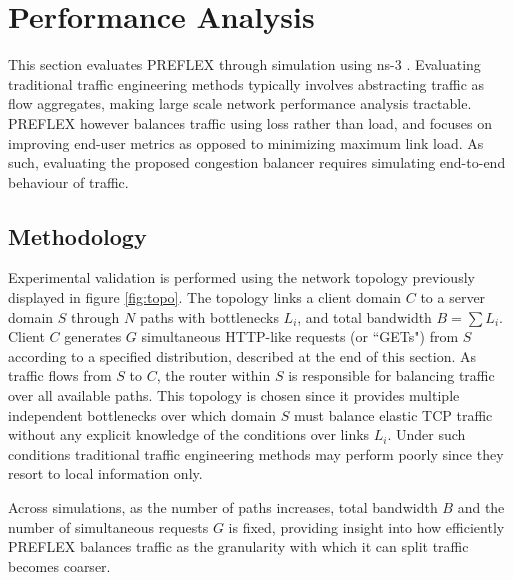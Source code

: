 \section{Performance Analysis}
\label{section:cateanalysis}

This section evaluates \ac{PREFLEX} through simulation using ns-3 \cite{ns3}. 
Evaluating traditional traffic engineering methods typically involves abstracting traffic as flow aggregates, making large scale network performance analysis tractable.
\ac{PREFLEX} however balances traffic using loss rather than load, and focuses on improving end-user metrics as opposed to minimizing maximum link load.
As such, evaluating the proposed congestion balancer requires simulating end-to-end behaviour of traffic.

\subsection{Methodology}
\label{section:methodology}

Experimental validation is performed using the network topology previously displayed in figure \ref{fig:topo}. 
The topology links a client domain $C$ to a server domain $S$ through $N$ paths with bottlenecks $L_i$, and total bandwidth $B=\sum{L_i}$. 
Client $C$ generates $G$ simultaneous \ac{HTTP}-like requests (or ``GETs") from $S$ according to a specified distribution, described at the end of this section. 
As traffic flows from $S$ to $C$, the router within $S$ is responsible for balancing traffic over all available paths.
This topology is chosen since it provides multiple independent bottlenecks over which domain $S$ must balance elastic \ac{TCP} traffic without any explicit knowledge of the conditions over links $L_i$.
Under such conditions traditional traffic engineering methods may perform poorly since they resort to local information only.

Across simulations, as the number of paths increases, total bandwidth $B$ and the number of simultaneous requests $G$ is fixed, providing insight into how efficiently \ac{PREFLEX} balances traffic as the granularity with which it can split traffic becomes coarser.

